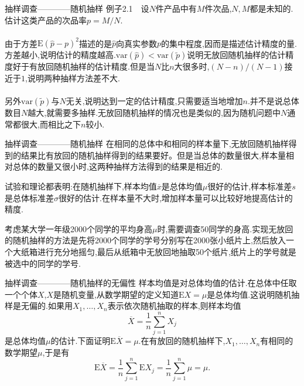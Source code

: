 \begin{frame}{抽样调查————随机抽样}
例子2.1$\quad$设$N$件产品中有$M$件次品,$N,M$都是未知的.估计这类产品的次品率$p=M/N$.
\\ \hspace*{\fill} \\
由于方差$\mathrm{E}(\hat{p}-p)^2$描述的是$\hat{p}$向真实参数$p$的集中程度,因而是描述估计精度的量.方差越小,说明估计的精度越高.$\mathrm{var}(\hat{p})<\mathrm{var}(\tilde{p})$说明无放回随机抽样的估计精度好于有放回随机抽样的估计精度.但是当$N$比$n$大很多时,$(N-n)/(N-1)$接近于$1$,说明两种抽样方法差不大.
\\ \hspace*{\fill} \\
另外$\mathrm{var}(\tilde{p})$与$N$无关,说明达到一定的估计精度,只需要适当地增加$n$.并不是说总体数目$N$越大,就需要多抽样.无放回随机抽样的情况也是类似的,因为随机问题中$N$通常都很大,而相比之下$n$较小.
\end{frame}

\begin{frame}{抽样调查————随机抽样}
在相同的总体中和相同的样本量下,无放回随机抽样得到的结果比有放回的随机抽样得到的结果要好。但是当总体的数量很大,样本量相对总体的数量又很小时,这两种抽样方法得到的结果是相近的.

试验和理论都表明:在随机抽样下,样本均值$\overline{x}$是总体均值$\mu$很好的估计,样本标准差$s$是总体标准差$\sigma$很好的估计.在样本量不大时,增加样本量可以比较好地提高估计的精度.

考虑某大学一年级2000个同学的平均身高$\mu$时,需要调查50同学的身高.实现无放回的随机抽样的方法是先将2000个同学的学号分别写在2000张小纸片上,然后放入一个大纸箱进行充分地摇匀,最后从纸箱中无放回地抽取50个纸片,纸片上的学号就是被选中的同学的学号.
\end{frame}

\begin{frame}{抽样调查————随机抽样的无偏性}
样本均值是对总体均值的估计.在总体中任取一个个体$X$,$X$是随机变量,从数学期望的定义知道$\mathrm{E}X=\mu$是总体均值.这说明随机抽样是无偏的.如果用$X_1,\dots,X_n$表示依次随机抽取的样本,则样本均值
\begin{equation}
\overline{X} = \frac{1}{n}\sum_{j=1}^{n}X_j
\end{equation}
是总体均值$\mu$的估计.下面证明$\mathrm{E}\overline{X} = \mu$.在有放回的随机抽样下,$X_1,\dots,X_n$有相同的数学期望$\mu$,于是有
\begin{equation}
\mathrm{E}\overline{X} = \frac{1}{n}\sum_{j=1}^{n}\mathrm{E}X_j = \frac{1}{n}\sum_{j=1}^{n}\mu = \mu.
\end{equation}
\end{frame}

